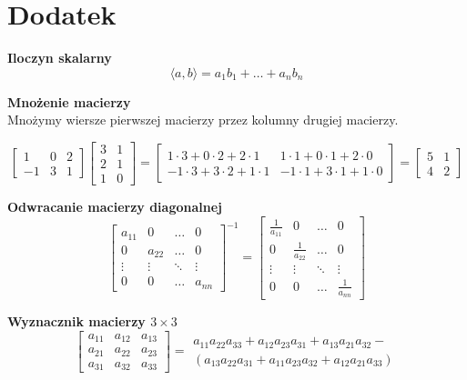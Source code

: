\documentclass[../mn-notatki.tex]{subfiles}
\begin{document}
\section{Dodatek}

\begin{tcolorbox}
\textbf{Iloczyn skalarny}
\[
\langle a, b \rangle = a_1 b_1 + \ldots + a_n b_n
\]
\end{tcolorbox}


\begin{tcolorbox}
\textbf{Mnożenie macierzy}\\
Mnożymy wiersze pierwszej macierzy przez kolumny drugiej macierzy.

\[
{\begin{bmatrix}1&0&2\\-1&3&1\end{bmatrix}} {\begin{bmatrix}3&1\\2&1\\1&0\end{bmatrix}}=
{\begin{bmatrix}1\cdot 3+0\cdot 2+2\cdot 1&1\cdot 1+0\cdot 1+2\cdot 0\\
-1\cdot 3+3\cdot 2+1\cdot 1&-1\cdot 1+3\cdot 1+1\cdot 0\end{bmatrix}}=
{\begin{bmatrix}5&1\\4&2\end{bmatrix}}
\]
\end{tcolorbox}

\begin{tcolorbox}
\textbf{Odwracanie macierzy diagonalnej}
\[
\begin{bmatrix}
a_{11} & 0 & \ldots & 0\\
0 & a_{22} & \ldots & 0\\
\vdots & \vdots & \ddots & \vdots\\
0 & 0 & \ldots & a_{nn}
\end{bmatrix}^{-1}
=
\begin{bmatrix}
\frac{1}{a_{11}} & 0 & \ldots & 0\\
0 & \frac{1}{a_{22}} & \ldots & 0\\
\vdots & \vdots & \ddots & \vdots\\
0 & 0 & \ldots & \frac{1}{a_{nn}}
\end{bmatrix}
\]
\end{tcolorbox}

\begin{tcolorbox}
\textbf{Wyznacznik macierzy $3 \times 3$}
\[
\begin{bmatrix}
a_{11} & a_{12} & a_{13}\\
a_{21} & a_{22} & a_{23}\\
a_{31} & a_{32} & a_{33}
\end{bmatrix}
=
\substack{a_{11}a_{22}a_{33}+a_{12}a_{23}a_{31}+a_{13}a_{21}a_{32}-\\
(a_{13}a_{22}a_{31}+a_{11}a_{23}a_{32}+a_{12}a_{21}a_{33})
}
\]
\end{tcolorbox}
\end{document}
